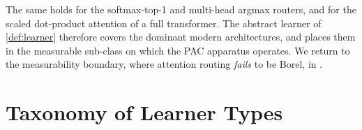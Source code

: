 The same holds for the softmax-top-1 and multi-head argmax routers, and for the scaled dot-product attention of a full transformer. The abstract learner of \cref{def:learner} therefore covers the dominant modern architectures, and places them in the measurable sub-class on which the PAC apparatus operates. We return to the measurability boundary, where attention routing \emph{fails} to be Borel, in .


\section{Taxonomy of Learner Types}
\label{sec:learner-taxonomy}

